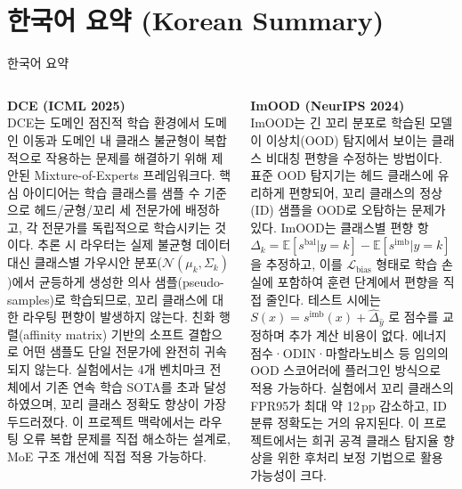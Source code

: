 \documentclass[aspectratio=169,10pt]{beamer}
\begin{document}
\section{한국어 요약 (Korean Summary)}

\begin{frame}{한국어 요약}
  \begin{columns}[T]
      \textbf{\textcolor{dcecol}{DCE (ICML 2025)}}\\[4pt]
      DCE는 도메인 점진적 학습 환경에서 도메인 이동과 도메인 내 클래스 불균형이 복합적으로 작용하는 문제를 해결하기 위해 제안된 Mixture-of-Experts 프레임워크다.
      핵심 아이디어는 학습 클래스를 샘플 수 기준으로 헤드/균형/꼬리 세 전문가에 배정하고, 각 전문가를 독립적으로 학습시키는 것이다.
      추론 시 라우터는 실제 불균형 데이터 대신 클래스별 가우시안 분포($\mathcal{N}(\mu_k, \Sigma_k)$)에서 균등하게 생성한 의사 샘플(pseudo-samples)로 학습되므로, 꼬리 클래스에 대한 라우팅 편향이 발생하지 않는다.
      친화 행렬(affinity matrix) 기반의 소프트 결합으로 어떤 샘플도 단일 전문가에 완전히 귀속되지 않는다.
      실험에서는 4개 벤치마크 전체에서 기존 연속 학습 SOTA를 초과 달성하였으며,
      꼬리 클래스 정확도 향상이 가장 두드러졌다.
      이 프로젝트 맥락에서는 라우팅 오류 복합 문제를 직접 해소하는 설계로, MoE 구조 개선에 직접 적용 가능하다.

      \textbf{\textcolor{imoocol}{ImOOD (NeurIPS 2024)}}\\[4pt]
      ImOOD는 긴 꼬리 분포로 학습된 모델이 이상치(OOD) 탐지에서 보이는 클래스 비대칭 편향을 수정하는 방법이다.
      표준 OOD 탐지기는 헤드 클래스에 유리하게 편향되어, 꼬리 클래스의 정상(ID) 샘플을 OOD로 오탐하는 문제가 있다.
      ImOOD는 클래스별 편향 항 $\Delta_k = \mathbb{E}[s^{\text{bal}}|y\!=\!k] - \mathbb{E}[s^{\text{imb}}|y\!=\!k]$을 추정하고,
      이를 $\mathcal{L}_{\text{bias}}$ 형태로 학습 손실에 포함하여 훈련 단계에서 편향을 직접 줄인다.
      테스트 시에는 $S(x) = s^{\text{imb}}(x) + \hat{\Delta}_{\hat{y}}$ 로 점수를 교정하며 추가 계산 비용이 없다.
      에너지 점수·ODIN·마할라노비스 등 임의의 OOD 스코어러에 플러그인 방식으로 적용 가능하다.
      실험에서 꼬리 클래스의 FPR95가 최대 약 12\,pp 감소하고, ID 분류 정확도는 거의 유지된다.
      이 프로젝트에서는 희귀 공격 클래스 탐지율 향상을 위한 후처리 보정 기법으로 활용 가능성이 크다.
  \end{columns}
\end{frame}
\end{document}

